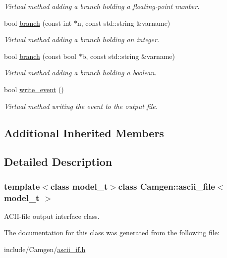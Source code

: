\begin{DoxyCompactItemize}
\begin{DoxyCompactList}\small\item\em Virtual method adding a branch holding a floating-\/point number. \end{DoxyCompactList}\item 
\hypertarget{a00017_a56c0f4e40901571c0e01a50df6ec08c6}{bool \hyperlink{a00017_a56c0f4e40901571c0e01a50df6ec08c6}{branch} (const int $\ast$n, const std\-::string \&varname)}\label{a00017_a56c0f4e40901571c0e01a50df6ec08c6}

\begin{DoxyCompactList}\small\item\em Virtual method adding a branch holding an integer. \end{DoxyCompactList}\item 
\hypertarget{a00017_ad1e9cff1329e77c9fcbc3f584a654f06}{bool \hyperlink{a00017_ad1e9cff1329e77c9fcbc3f584a654f06}{branch} (const bool $\ast$b, const std\-::string \&varname)}\label{a00017_ad1e9cff1329e77c9fcbc3f584a654f06}

\begin{DoxyCompactList}\small\item\em Virtual method adding a branch holding a boolean. \end{DoxyCompactList}\item 
\hypertarget{a00017_a54212a1c88acb99828bc4187ae7f781c}{bool \hyperlink{a00017_a54212a1c88acb99828bc4187ae7f781c}{write\-\_\-event} ()}\label{a00017_a54212a1c88acb99828bc4187ae7f781c}

\begin{DoxyCompactList}\small\item\em Virtual method writing the event to the output file. \end{DoxyCompactList}\end{DoxyCompactItemize}
\subsection*{Additional Inherited Members}


\subsection{Detailed Description}
\subsubsection*{template$<$class model\-\_\-t$>$class Camgen\-::ascii\-\_\-file$<$ model\-\_\-t $>$}

A\-C\-I\-I-\/file output interface class. 

The documentation for this class was generated from the following file\-:\begin{DoxyCompactItemize}
\item 
include/\-Camgen/\hyperlink{a00582}{ascii\-\_\-if.\-h}\end{DoxyCompactItemize}

